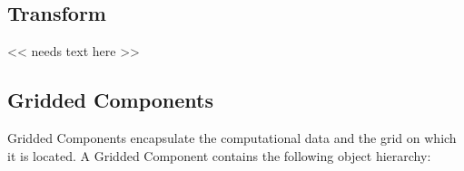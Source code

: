 
\subsection{Transform}

<< needs text here >>

\subsection{Gridded Components}

Gridded Components encapsulate the computational data and the
grid on which it is located.  A Gridded Component contains
the following object hierarchy:



